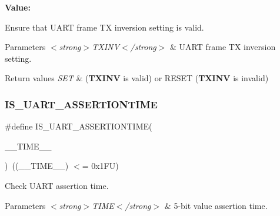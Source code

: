 {\bfseries Value\+:}
\begin{DoxyCode}{0}

\end{DoxyCode}


Ensure that U\+A\+RT frame TX inversion setting is valid. 


\begin{DoxyParams}{Parameters}
{\em $<$strong$>$\+T\+X\+I\+N\+V$<$/strong$>$} & U\+A\+RT frame TX inversion setting. \\
\hline
\end{DoxyParams}

\begin{DoxyRetVals}{Return values}
{\em S\+ET} & ({\bfseries{T\+X\+I\+NV}} is valid) or R\+E\+S\+ET ({\bfseries{T\+X\+I\+NV}} is invalid) \\
\hline
\end{DoxyRetVals}
\mbox{\label{group___u_a_r_t___private___macros_ga8acf6b6648717b7192439f1b426321a4}} 
\subsubsection{\texorpdfstring{IS\_UART\_ASSERTIONTIME}{IS\_UART\_ASSERTIONTIME}}
{\footnotesize\ttfamily \#define I\+S\+\_\+\+U\+A\+R\+T\+\_\+\+A\+S\+S\+E\+R\+T\+I\+O\+N\+T\+I\+ME(\begin{DoxyParamCaption}\item[{}]{\+\_\+\+\_\+\+T\+I\+M\+E\+\_\+\+\_\+ }\end{DoxyParamCaption})~((\+\_\+\+\_\+\+T\+I\+M\+E\+\_\+\+\_\+) $<$= 0x1\+F\+U)}



Check U\+A\+RT assertion time. 


\begin{DoxyParams}{Parameters}
{\em $<$strong$>$\+T\+I\+M\+E$<$/strong$>$} & 5-\/bit value assertion time. \\
\hline
\end{DoxyParams}

